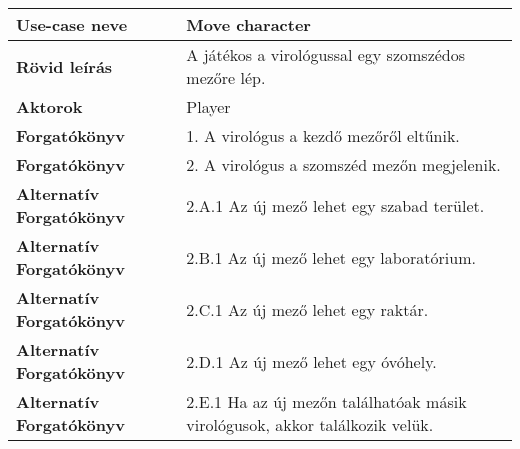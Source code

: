 \noindent\begin{tabularx}{\textwidth}{|l|X|}
	\hline
	\textbf{Use-case neve}           & \textbf{Move character
	}                                                                                                              \\
	\hline
	\hline
	\textbf{Rövid leírás}            & A játékos a virológussal egy szomszédos mezőre lép.
	\\
	\hline
	\textbf{Aktorok}                 & Player                                                                      \\
	\hline
	\textbf{Forgatókönyv}            & 1. A virológus a kezdő mezőről eltűnik.                                     \\
	\hline
	\textbf{Forgatókönyv}            & 2. A virológus a szomszéd mezőn megjelenik.                                 \\
	\hline
	\textbf{Alternatív Forgatókönyv} & 2.A.1 Az új mező lehet egy szabad terület.                                  \\
	\hline
	\textbf{Alternatív Forgatókönyv} & 2.B.1 Az új mező lehet egy laboratórium.                                    \\
	\hline
	\textbf{Alternatív Forgatókönyv} & 2.C.1 Az új mező lehet egy raktár.                                          \\
	\hline
	\textbf{Alternatív Forgatókönyv} & 2.D.1 Az új mező lehet egy óvóhely.                                         \\
	\hline
	\textbf{Alternatív Forgatókönyv} & 2.E.1 Ha az új mezőn találhatóak másik virológusok, akkor találkozik velük. \\
	\hline
\end{tabularx}

\bigskip

